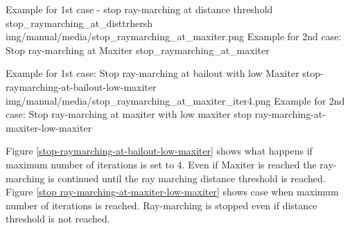 {Example for 1st case - stop ray-marching at distance threshold}
{stop_raymarching_at_disttrhersh}
{img/manual/media/stop_raymarching_at_maxiter.png}
{Example for 2nd case: Stop ray-marching at Maxiter}
{stop_raymarching_at_maxiter}

{Example for 1st case: Stop ray-marching at bailout with low Maxiter}
{stop-raymarching-at-bailout-low-maxiter}
{img/manual/media/stop_raymarching_at_maxiter_iter4.png}
{Example for 2nd case: Stop ray-marching at maxiter with low maxiter}
{stop ray-marching-at-maxiter-low-maxiter}

Figure \ref{stop-raymarching-at-bailout-low-maxiter} shows what happens if maximum number of iterations is set to 4. Even if Maxiter is reached the
ray-marching is continued until the ray marching distance threshold is reached.
Figure \ref{stop ray-marching-at-maxiter-low-maxiter} shows case when maximum number of iterations is reached. Ray-marching is stopped even
if distance threshold is not reached.

